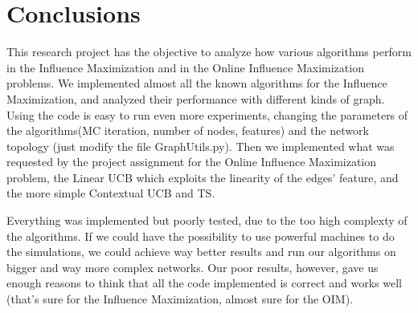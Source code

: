 \newpage
\section{Conclusions}
This research project has the objective to analyze how various algorithms perform in the Influence Maximization and in the Online Influence Maximization problems.
We implemented almost all the known algorithms for the Influence Maximization, and analyzed their performance with different kinds of graph.
Using the code is easy to run even more experiments, changing the parameters of the algorithms(MC iteration, number of nodes, features) and the network topology (just modify the file GraphUtils.py).
Then we implemented what was requested by the project assignment for the Online Influence Maximization problem, the Linear UCB which exploits the linearity of the edges' feature, and the more simple Contextual UCB and TS.

Everything was implemented but poorly tested, due to the too high complexty of the algorithms.
If we could have the possibility to use powerful machines to do the simulations, we could achieve way better results and run our algorithms on bigger and way more complex networks.
Our poor results, however, gave us enough reasons to think that all the code implemented is correct and works well (that's sure for the Influence Maximization, almost sure for the OIM).
